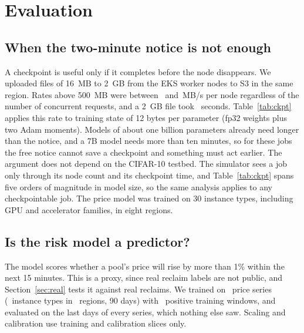 \documentclass{article}
\begin{document}
\section{Evaluation}
\label{sec:eval}

\subsection{When the two-minute notice is not enough}
\label{sec:notice}

A checkpoint is useful only if it completes before the node disappears. We uploaded files of 16~MB to 2~GB from the EKS worker nodes to S3 in the same region. Rates above 500~MB were between \awsRateMean\ and \awsRateMax\,MB/s per node regardless of the number of concurrent requests, and a 2~GB file took \awsTwoGbSeconds\ seconds. Table~\ref{tab:ckpt} applies this rate to training state of 12 bytes per parameter (fp32 weights plus two Adam moments). Models of about one billion parameters already need longer than the notice, and a 7B model needs more than ten minutes, so for these jobs the free notice cannot save a checkpoint and something must act earlier. The argument does not depend on the CIFAR-10 testbed. The simulator sees a job only through its node count and its checkpoint time, and Table~\ref{tab:ckpt} spans five orders of magnitude in model size, so the same analysis applies to any checkpointable job. The price model was trained on 30 instance types, including GPU and accelerator families, in eight regions.

\begin{table}[t]
  \centering
  \caption{Time to write a checkpoint from one EKS node to S3 at the measured rate. Training state is 12 bytes per parameter.}
  \label{tab:ckpt}
  \small
  
\end{table}

\subsection{Is the risk model a predictor?}
\label{sec:model}

The model scores whether a pool's price will rise by more than 1\% within the next 15 minutes. This is a proxy, since real reclaim labels are not public, and Section~\ref{sec:real} tests it against real reclaims. We trained on \nSeries\ price series (\nTypes\ instance types in \nRegions\ regions, 90 days) with \nTrainPos\ positive training windows, and evaluated on the last days of every series, which nothing else saw. Scaling and calibration use training and calibration slices only.
\end{document}
